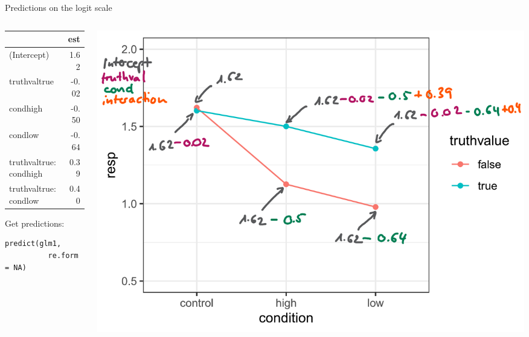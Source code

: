 \documentclass[aspectratio=169]{beamer}
\begin{document}
\begin{frame}[fragile]{Predictions on the logit scale}
  \begin{columns}
    \begin{column}[c]{.3\textwidth}
      {\small
      \begin{tabular}{@{}lr@{}}
        \hline
        & est \\
        \hline
       (Intercept)           &  1.62 \\
       truthvaltrue          & -0.02 \\
       condhigh              & -0.50 \\
       condlow               & -0.64 \\
       truthvaltrue:condhigh &  0.39 \\
       truthvaltrue:condlow  &  0.40 \\
        \hline
       \end{tabular}
       }

       \vspace{.3cm}
Get predictions:
\begin{lstlisting}[style = plain]
  predict(glm1,
          re.form = NA)
\end{lstlisting}
    \end{column}
    \begin{column}[c]{.7\textwidth}
      \includegraphics[scale = .35]{../figures/predlogit_with_params}
    \end{column}
  \end{columns}
\end{frame}
\end{document}
